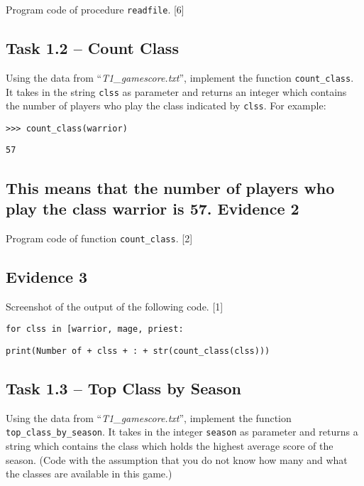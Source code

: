 Program code of procedure \texttt{readfile}. \hfill{}{[}6{]} 

\subsection*{Task 1.2 -- Count Class }

Using the data from \textquotedblleft \emph{T1\_gamescore.txt}\textquotedblright ,
implement the function \texttt{count\_class}. It takes in the string
\texttt{clss} as parameter and returns an integer which contains the
number of players who play the class indicated by \texttt{clss}. For
example:

\noindent %
\noindent\begin{minipage}[t]{1\columnwidth}%
\texttt{>\textcompwordmark >\textcompwordmark > count\_class(\textquotedbl warrior\textquotedbl ) }

\texttt{57}%
\end{minipage}

\subsection*{This means that the number of players who play the class warrior
is 57. Evidence 2 }

Program code of function \texttt{count\_class}.\hfill{} {[}2{]}

\subsection*{Evidence 3 }

Screenshot of the output of the following code. \hfill{}{[}1{]}

\noindent\begin{minipage}[t]{1\columnwidth}%
\texttt{for clss in {[}\textquotedbl warrior\textquotedbl , \textquotedbl mage\textquotedbl ,
\textquotedbl priest\textquotedbl{]}: }

\texttt{\qquad{}print(\textquotedbl Number of \textquotedbl{} +
clss + \textquotedbl :\textquotedbl{} + str(count\_class(clss))) }%
\end{minipage}

\subsection*{Task 1.3 -- Top Class by Season }

Using the data from \textquotedblleft \emph{T1\_gamescore.txt}\textquotedblright ,
implement the function \texttt{top\_class\_by\_season}. It takes in
the integer \texttt{season} as parameter and returns a string which
contains the class which holds the highest average score of the season.
(Code with the assumption that you do not know how many and what the
classes are available in this game.) 

